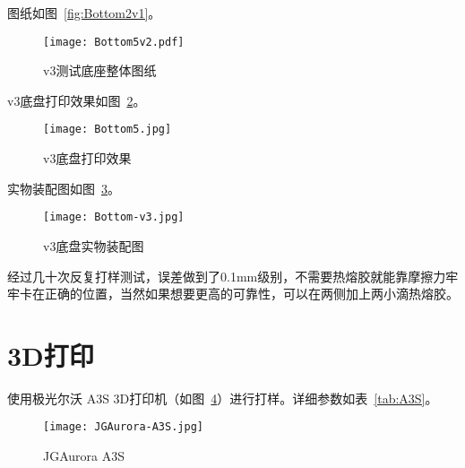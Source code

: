图纸如图~\ref{fig:Bottom2v1}。

\begin{figure}[htbp]
    \centering
    \texttt{[image: Bottom5v2.pdf]}
    \caption{v3测试底座整体图纸}
    \label{fig:Bottom5v2}
\end{figure}

v3底盘打印效果如图~\ref{fig:Bottom5}。

\begin{figure}[htbp]
    \centering
    \texttt{[image: Bottom5.jpg]}
    \caption{v3底盘打印效果}
    \label{fig:Bottom5}
\end{figure}

实物装配图如图~\ref{fig:Bottom-v3}。

\begin{figure}[htbp]
    \centering
    \texttt{[image: Bottom-v3.jpg]}
    \caption{v3底盘实物装配图}
    \label{fig:Bottom-v3}
\end{figure}

经过几十次反复打样测试，误差做到了0.1mm级别，不需要热熔胶就能靠摩擦力牢牢卡在正确的位置，当然如果想要更高的可靠性，可以在两侧加上两小滴热熔胶。

\section{3D打印}

使用极光尔沃 A3S 3D打印机（如图~\ref{fig:A3S}）进行打样。详细参数如表~\ref{tab:A3S}。

\begin{figure}[htbp]
    \centering
    \texttt{[image: JGAurora-A3S.jpg]}
    \caption{JGAurora A3S}
    \label{fig:A3S}
\end{figure}

